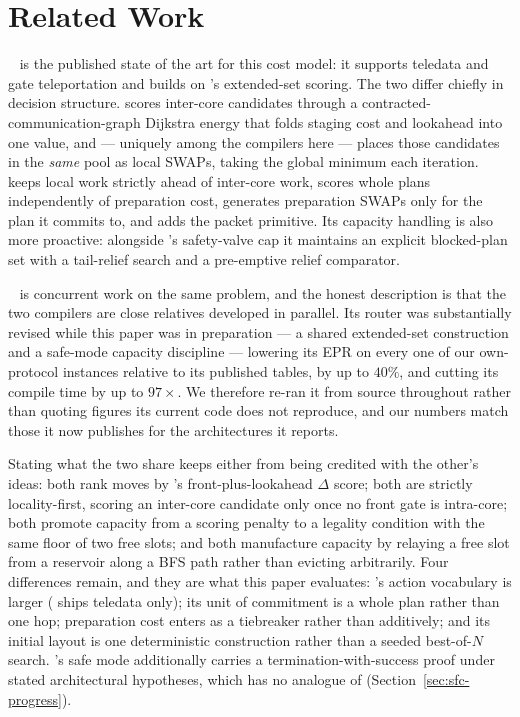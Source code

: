 \section{Related Work}
\label{sec:related}

\textbf{\TeleSABRE{}}~\cite{russo2025telesabre} is the published state
of the art for this cost model: it supports teledata and gate
teleportation and builds on \SABRE{}'s extended-set scoring. The two
differ chiefly in decision structure. \TeleSABRE{} scores inter-core
candidates through a contracted-communication-graph Dijkstra energy
that folds staging cost and lookahead into one value, and --- uniquely
among the compilers here --- places those candidates in the \emph{same}
pool as local SWAPs, taking the global minimum each iteration.
\PORTER{} keeps local work strictly ahead of inter-core work, scores
whole plans independently of preparation cost, generates preparation
SWAPs only for the plan it commits to, and adds the packet primitive.
Its capacity handling is also more proactive: alongside \TeleSABRE{}'s
safety-valve cap it maintains an explicit blocked-plan set with a
tail-relief search and a pre-emptive relief comparator.

\textbf{\dSABRE{}}~\cite{lidsabre} is concurrent work on the same
problem, and the honest description is that the two compilers are close
relatives developed in parallel. Its router was substantially revised
while this paper was in preparation --- a shared extended-set
construction and a safe-mode capacity discipline --- lowering its EPR
on every one of our own-protocol instances relative to its published
tables, by up to $40\%$, and cutting its compile time by up to
$97\times$. We therefore re-ran it from source throughout rather than
quoting figures its current code does not reproduce, and our numbers
match those it now publishes for the architectures it reports.

Stating what the two share keeps either from being credited with the
other's ideas: both rank moves by \SABRE{}'s
front-plus-lookahead $\Delta$ score; both are strictly locality-first,
scoring an inter-core candidate only once no front gate is intra-core;
both promote capacity from a scoring penalty to a legality condition
with the same floor of two free slots; and both manufacture capacity by
relaying a free slot from a reservoir along a BFS path rather than
evicting arbitrarily. Four differences remain, and they are what this paper
evaluates: \PORTER{}'s action vocabulary is larger (\dSABRE{} ships
teledata only); its unit of commitment is a whole plan rather than one
hop; preparation cost enters as a tiebreaker rather than additively;
and its initial layout is one deterministic construction rather than a
seeded best-of-$N$ search. \dSABRE{}'s safe mode additionally carries a
termination-with-success proof under stated architectural hypotheses,
which \PORTER{} has no analogue of (Section~\ref{sec:sfc-progress}).

